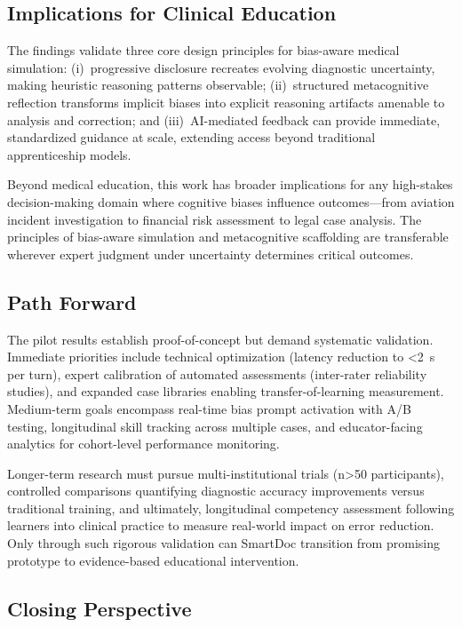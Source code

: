 \subsection{Implications for Clinical Education}

The findings validate three core design principles for bias-aware medical simulation:
(i)~progressive disclosure recreates evolving diagnostic uncertainty, making heuristic reasoning
patterns observable; (ii)~structured metacognitive reflection transforms implicit biases into
explicit reasoning artifacts amenable to analysis and correction; and (iii)~AI-mediated feedback
can provide immediate, standardized guidance at scale, extending access beyond traditional
apprenticeship models.

Beyond medical education, this work has broader implications for any high-stakes decision-making
domain where cognitive biases influence outcomes—from aviation incident investigation to financial
risk assessment to legal case analysis. The principles of bias-aware simulation and metacognitive
scaffolding are transferable wherever expert judgment under uncertainty determines critical outcomes.

\subsection{Path Forward}

The pilot results establish proof-of-concept but demand systematic validation. Immediate priorities
include technical optimization (latency reduction to <2~s per turn), expert calibration of automated
assessments (inter-rater reliability studies), and expanded case libraries enabling transfer-of-learning
measurement. Medium-term goals encompass real-time bias prompt activation with A/B testing,
longitudinal skill tracking across multiple cases, and educator-facing analytics for cohort-level
performance monitoring.

Longer-term research must pursue multi-institutional trials (n>50 participants), controlled
comparisons quantifying diagnostic accuracy improvements versus traditional training, and ultimately,
longitudinal competency assessment following learners into clinical practice to measure real-world
impact on error reduction. Only through such rigorous validation can SmartDoc transition from
promising prototype to evidence-based educational intervention.

\subsection{Closing Perspective}

